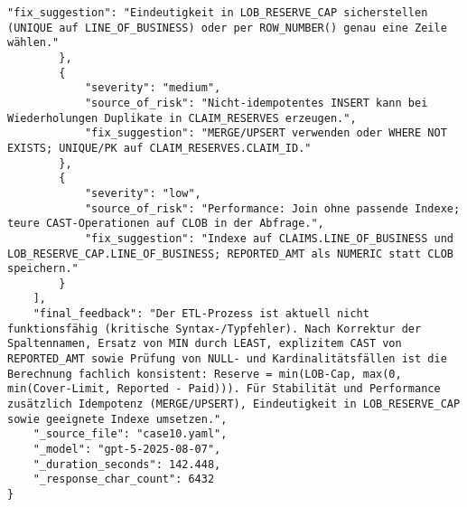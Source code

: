\begin{lstlisting}[caption={Ausgabe: GPT-5 Anwendungsfall 10 Konsistenzdurchlauf},label={gpt_case10_prompt2}]
            "fix_suggestion": "Eindeutigkeit in LOB_RESERVE_CAP sicherstellen (UNIQUE auf LINE_OF_BUSINESS) oder per ROW_NUMBER() genau eine Zeile wählen."
        },
        {
            "severity": "medium",
            "source_of_risk": "Nicht-idempotentes INSERT kann bei Wiederholungen Duplikate in CLAIM_RESERVES erzeugen.",
            "fix_suggestion": "MERGE/UPSERT verwenden oder WHERE NOT EXISTS; UNIQUE/PK auf CLAIM_RESERVES.CLAIM_ID."
        },
        {
            "severity": "low",
            "source_of_risk": "Performance: Join ohne passende Indexe; teure CAST-Operationen auf CLOB in der Abfrage.",
            "fix_suggestion": "Indexe auf CLAIMS.LINE_OF_BUSINESS und LOB_RESERVE_CAP.LINE_OF_BUSINESS; REPORTED_AMT als NUMERIC statt CLOB speichern."
        }
    ],
    "final_feedback": "Der ETL-Prozess ist aktuell nicht funktionsfähig (kritische Syntax-/Typfehler). Nach Korrektur der Spaltennamen, Ersatz von MIN durch LEAST, explizitem CAST von REPORTED_AMT sowie Prüfung von NULL- und Kardinalitätsfällen ist die Berechnung fachlich konsistent: Reserve = min(LOB-Cap, max(0, min(Cover-Limit, Reported - Paid))). Für Stabilität und Performance zusätzlich Idempotenz (MERGE/UPSERT), Eindeutigkeit in LOB_RESERVE_CAP sowie geeignete Indexe umsetzen.",
    "_source_file": "case10.yaml",
    "_model": "gpt-5-2025-08-07",
    "_duration_seconds": 142.448,
    "_response_char_count": 6432
}
\end{lstlisting}

